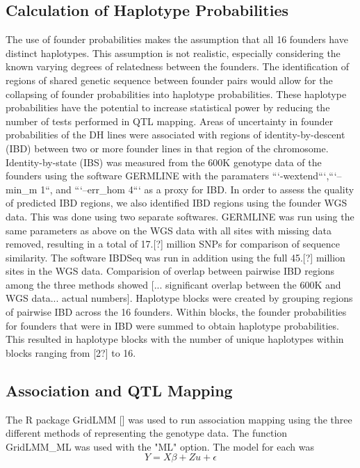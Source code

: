 \documentclass[article,9pt,twocolumn,twoside]{rilabRxiv}
\begin{document}
\subsection{Calculation of Haplotype Probabilities}
The use of founder probabilities makes the assumption that all 16 founders have
distinct haplotypes. This assumption is not realistic, especially considering the
known varying degrees of relatedness between the founders. The identification of
regions of shared genetic sequence between founder pairs would allow for the collapsing
of founder probabilities into haplotype probabilities. These haplotype probabilities
have the potential to increase statistical power by reducing the number of tests
performed in QTL mapping. Areas of uncertainty in founder probabilities of the
DH lines were associated with regions of identity-by-descent (IBD) between two or
 more founder lines in that region of the chromosome. Identity-by-state (IBS) was measured from the
600K genotype data of the founders using the software GERMLINE with the paramaters
```-wextend```,```--min\_m 1``, and ```--err\_hom 4``` as a proxy for IBD. In order
 to assess the quality of predicted IBD regions, we also identified IBD regions
 using the founder WGS data. This was done using two separate softwares. GERMLINE
 was run using the same parameters as above on the WGS data with all sites with
 missing data removed, resulting in a total of 17.[?] million SNPs for comparison
 of sequence similarity. The software IBDSeq was run in addition using the full
 45.[?] million sites in the WGS data. Comparision of overlap between pairwise IBD
 regions among the three methods showed [... significant overlap between the 600K
 and WGS data... actual numbers]. Haplotype blocks were created by grouping regions
  of pairwise IBD across the 16 founders. Within blocks, the founder probabilities
  for founders that were in  IBD were summed to obtain haplotype probabilities.
  This resulted in haplotype blocks with the number of unique haplotypes within
   blocks ranging from [2?] to 16.

\subsection{Association and QTL Mapping}
The R package GridLMM [] was used to run association mapping using the three
 different methods of representing the genotype data. The function GridLMM\_ML was
 used with the "ML" option. The model for each was
\begin{equation}
\label{eqn:gridlmm}
 Y = X\beta + Zu + \epsilon
\end{equation}
\end{document}
